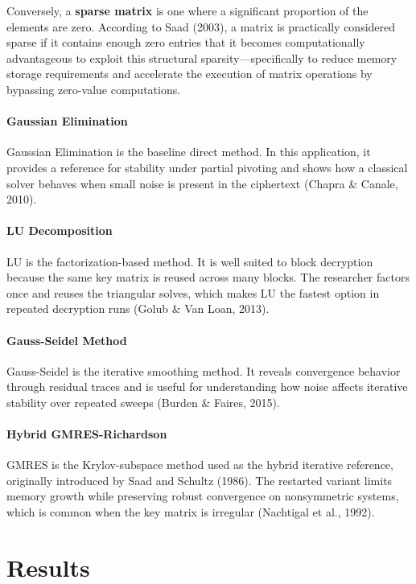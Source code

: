 \documentclass[11pt]{article}
\begin{document}
Conversely, a \textbf{sparse matrix} is one where a significant proportion of the elements are zero. According to Saad (2003), a matrix is practically considered sparse if it contains enough zero entries that it becomes computationally advantageous to exploit this structural sparsity—specifically to reduce memory storage requirements and accelerate the execution of matrix operations by bypassing zero-value computations.

\paragraph{Gaussian Elimination}
Gaussian Elimination is the baseline direct method. In this application, it provides a reference for stability under partial pivoting and shows how a classical solver behaves when small noise is present in the ciphertext (Chapra \& Canale, 2010).

\paragraph{LU Decomposition}
LU is the factorization-based method. It is well suited to block decryption because the same key matrix is reused across many blocks. The researcher factors once and reuses the triangular solves, which makes LU the fastest option in repeated decryption runs (Golub \& Van Loan, 2013).

\paragraph{Gauss-Seidel Method}
Gauss-Seidel is the iterative smoothing method. It reveals convergence behavior through residual traces and is useful for understanding how noise affects iterative stability over repeated sweeps (Burden \& Faires, 2015).

\paragraph{Hybrid GMRES-Richardson}
GMRES is the Krylov-subspace method used as the hybrid iterative reference, originally introduced by Saad and Schultz (1986). The restarted variant limits memory growth while preserving robust convergence on nonsymmetric systems, which is common when the key matrix is irregular (Nachtigal et al., 1992).

\section{Results}
\end{document}
